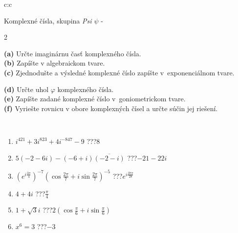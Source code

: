 \documentclass[10pt]{report}
\begin{document}
\begin{tabular}{c:c}
\begin{minipage}[c][104.5mm][t]{0.5\linewidth}
\begin{center}
\vspace{7mm}
{\huge Komplexné čísla, skupina \textit{Psi $\psi$} -}\\[5mm]
\begin{minipage}{0.95\linewidth}
\begin{center}
{\small \begin{multicols}{2} \raggedright
\textbf{(a)} Určte imaginárnu časť komplexného čísla. \\[1mm]
\textbf{(b)} Zapíšte v algebraickom tvare. \\[1mm]
\textbf{(c)} Zjednodušte a výsledné komplexné číslo zapíšte v~exponenciálnom tvare. \par \columnbreak
\textbf{(d)} Určte uhol \(\varphi\) komplexného čísla. \\[1mm]
\textbf{(e)} Zapíšte zadané komplexné číslo v~goniometrickom tvare. \\[1mm]
\textbf{(f)} Vyriešte rovnicu v obore komplexných čísel a určte súčin jej riešení.
\end{multicols}
}
\end{center}
\end{minipage}
\\[4mm]
\begin{minipage}{0.79\linewidth}
\begin{center}
\begin{varwidth}{\linewidth}
\begin{enumerate}
\large
\item $i^{421}+3i^{823}+4i^{-847}-9$\quad \dotfill\; ???\;\dotfill \quad $8$
\item $5(-2-6i)-(-6+i)\overline{(-2-i)}$\quad \dotfill\; ???\;\dotfill \quad $-21-22i$
\item $\left(e^{i\frac{3\pi}{4}}\right)^{-7}\left(\cos{\frac{2\pi}{7}}+i\sin{\frac{2\pi}{7}}\right)^{-5}$\quad \dotfill\; ???\;\dotfill \quad $e^{i\frac{37\pi}{28}}$
\item $4+4i$\quad \dotfill\; ???\;\dotfill \quad $\frac{\pi}{4}$
\item $1+\sqrt{3}i$\quad \dotfill\; ???\;\dotfill \quad $2\left(\cos{\frac{\pi}{6}}+i\sin{\frac{\pi}{6}}\right)$
\item $x^6=3$\quad \dotfill\; ???\;\dotfill \quad $-3$
\end{enumerate}
\end{varwidth}

\end{center}
\end{minipage}
\end{center}
\end{minipage}
\end{tabular}
\end{document}
